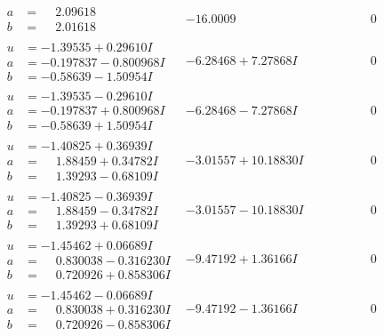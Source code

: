 \documentclass[1p]{elsarticle_modified}
\theoremstyle{definition}
\begin{document}
$$\begin{array}{c|c|c}
\begin{aligned}
a &= \phantom{-}2.09618\phantom{ +0.000000I} \\
b &= \phantom{-}2.01618\phantom{ +0.000000I}\end{aligned}
 & -16.0009\phantom{ +0.000000I} & \phantom{-0.000000 } 0 \\ \hline\begin{aligned}
u &= -1.39535 + 0.29610 I \\
a &= -0.197837 - 0.800968 I \\
b &= -0.58639 - 1.50954 I\end{aligned}
 & -6.28468 + 7.27868 I & \phantom{-0.000000 } 0 \\ \hline\begin{aligned}
u &= -1.39535 - 0.29610 I \\
a &= -0.197837 + 0.800968 I \\
b &= -0.58639 + 1.50954 I\end{aligned}
 & -6.28468 - 7.27868 I & \phantom{-0.000000 } 0 \\ \hline\begin{aligned}
u &= -1.40825 + 0.36939 I \\
a &= \phantom{-}1.88459 + 0.34782 I \\
b &= \phantom{-}1.39293 - 0.68109 I\end{aligned}
 & -3.01557 + 10.18830 I & \phantom{-0.000000 } 0 \\ \hline\begin{aligned}
u &= -1.40825 - 0.36939 I \\
a &= \phantom{-}1.88459 - 0.34782 I \\
b &= \phantom{-}1.39293 + 0.68109 I\end{aligned}
 & -3.01557 - 10.18830 I & \phantom{-0.000000 } 0 \\ \hline\begin{aligned}
u &= -1.45462 + 0.06689 I \\
a &= \phantom{-}0.830038 - 0.316230 I \\
b &= \phantom{-}0.720926 + 0.858306 I\end{aligned}
 & -9.47192 + 1.36166 I & \phantom{-0.000000 } 0 \\ \hline\begin{aligned}
u &= -1.45462 - 0.06689 I \\
a &= \phantom{-}0.830038 + 0.316230 I \\
b &= \phantom{-}0.720926 - 0.858306 I\end{aligned}
 & -9.47192 - 1.36166 I & \phantom{-0.000000 } 0 \\ \hline\begin{aligned}

\end{aligned}
\end{array}$$
\end{document}
